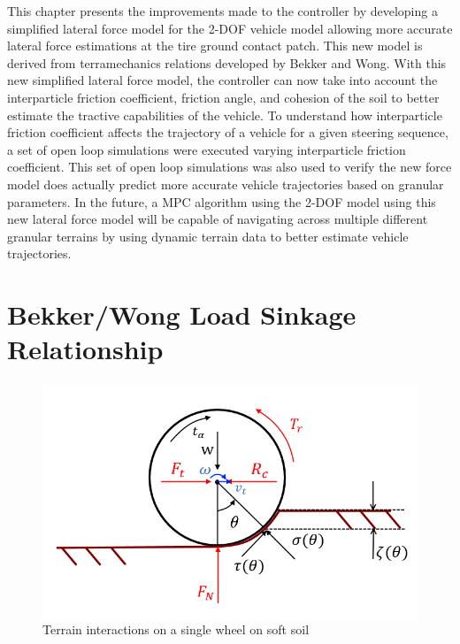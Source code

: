 \documentclass[12pt,onecolumn]{report}
\begin{document}
This chapter presents the improvements made to the controller by developing a simplified lateral force model for the 2-DOF vehicle model allowing more accurate lateral force estimations at the tire ground contact patch. This new model is derived from terramechanics relations developed by Bekker and Wong. With this new simplified lateral force model, the controller can now take into account the interparticle friction coefficient, friction angle, and cohesion of the soil to better estimate the tractive capabilities of the vehicle. To understand how interparticle friction coefficient affects the trajectory of a vehicle for a given steering sequence, a set of open loop simulations were executed varying interparticle friction coefficient. This set of open loop simulations was also used to verify the new force model does actually predict more accurate vehicle trajectories based on granular parameters. In the future, a MPC algorithm using the 2-DOF model using this new lateral force model will be capable of navigating across multiple different granular terrains by using dynamic terrain data to better estimate vehicle trajectories. 

\section{Bekker/Wong Load Sinkage Relationship}\label{s:BekkerWong}

\begin{figure}
	\centering
	\includegraphics[width=0.8\columnwidth]{Figs/tireRolling.png}
	\caption{\small Terrain interactions on a single wheel on soft soil}  
	\label{fig:wheelTerrain}
\end{figure}
\end{document}
